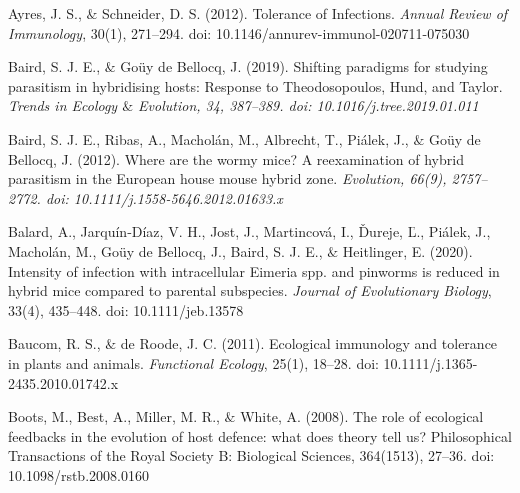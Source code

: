 \documentclass[12pt]{article}
\renewcommand{\_}{\kern-1.5pt\textunderscore\kern-1.5pt}
\begin{document}
\begin{FlushLeft}
Ayres, J. S., $\&$  Schneider, D. S. (2012). Tolerance of Infections. \textit{Annual Review of Immunology}, 30(1), 271–294. doi: 10.1146/annurev-immunol-020711-075030
\end{FlushLeft}\par

\begin{FlushLeft}
Baird, S. J. E., $\&$  Goüy de Bellocq, J. (2019). Shifting paradigms for studying parasitism in hybridising hosts: Response to Theodosopoulos, Hund, and Taylor. \textit{Trends in Ecology $\&$  Evolution, 34, 387–389. doi: 10.1016/j.tree.2019.01.011}
\end{FlushLeft}\par

\begin{FlushLeft}
Baird, S. J. E., Ribas, A., Macholán, M., Albrecht, T., Piálek, J., $\&$  Goüy de Bellocq, J. (2012). Where are the wormy mice? A reexamination of hybrid parasitism in the European house mouse hybrid zone. \textit{Evolution, 66(9), 2757–2772. doi: 10.1111/j.1558-5646.2012.01633.x}
\end{FlushLeft}\par

\begin{FlushLeft}
Balard, A., Jarquín‐Díaz, V. H., Jost, J., Martincová, I., Ďureje, Ľ., Piálek, J., Macholán, M., Goüy de Bellocq, J., Baird, S. J. E., $\&$  Heitlinger, E. (2020). Intensity of infection with intracellular Eimeria spp. and pinworms is reduced in hybrid mice compared to parental subspecies. \textit{Journal of Evolutionary Biology}, 33(4), 435–448. doi: 10.1111/jeb.13578
\end{FlushLeft}\par

\begin{FlushLeft}
\textcolor[HTML]{1C1D1E}{Baucom, R. S., $\&$  de Roode, J. C. (2011). Ecological immunology and tolerance in plants and animals. \textit{Functional Ecolog}}\textit{y}, 25(1), 18–28. doi: 10.1111/j.1365-2435.2010.01742.x
\end{FlushLeft}\par

\begin{FlushLeft}
Boots, M., Best, A., Miller, M. R., $\&$  White, A. (2008). The role of ecological feedbacks in the evolution of host defence: what does theory tell us? Philosophical Transactions of the Royal Society B: Biological Sciences, 364(1513), 27–36. doi: 10.1098/rstb.2008.0160
\end{FlushLeft}\par
\end{document}
